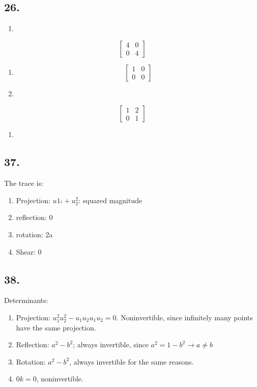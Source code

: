 \documentclass[]{article}
\newcommand{\m}[1]{\begin{bmatrix}#1\end{bmatrix}}
\begin{document}
{\hypertarget{section-23}{%
\subsection{26.}\label{section-23}}

\begin{enumerate}
\def\labelenumi{\alph{enumi}.}
\item
\end{enumerate}

\[\m{4&0\\
0&4}\]

\begin{enumerate}
\def\labelenumi{\alph{enumi}.}
\setcounter{enumi}{1}
\item
  \[\m{1&0\\0&0}\]
\item
\end{enumerate}

\[\m{1&2\\
0&1}\]

\begin{enumerate}
\def\labelenumi{\alph{enumi}.}
\setcounter{enumi}{4}
\item
\end{enumerate}

\hypertarget{section-24}{%
\subsection{37.}\label{section-24}}

The trace is:

\begin{enumerate}
\def\labelenumi{\alph{enumi}.}
\item
  Projection: \(u1_^2+u_2^2\): squared magnitude
\item
  reflection: 0
\item
  rotation: 2a
\item
  Shear: 0
\end{enumerate}

\hypertarget{section-25}{%
\subsection{38.}\label{section-25}}

Determinants:

\begin{enumerate}
\def\labelenumi{\alph{enumi}.}
\item
  Projection: \(u_1^2u_2^2-u_1u_2u_1u_2=0\). Noninvertible, since
  infinitely many points have the same projection.
\item
  Reflection: \(a^2-b^2\); always invertible, since
  \(a^2=1-b^2\rightarrow{a\neq{b}}\)
\item
  Rotation: \(a^2-b^2\), always invertible for the same reasons.
\item
  \(0k=0\), noninvertible.
\end{enumerate}

}
\end{document}
